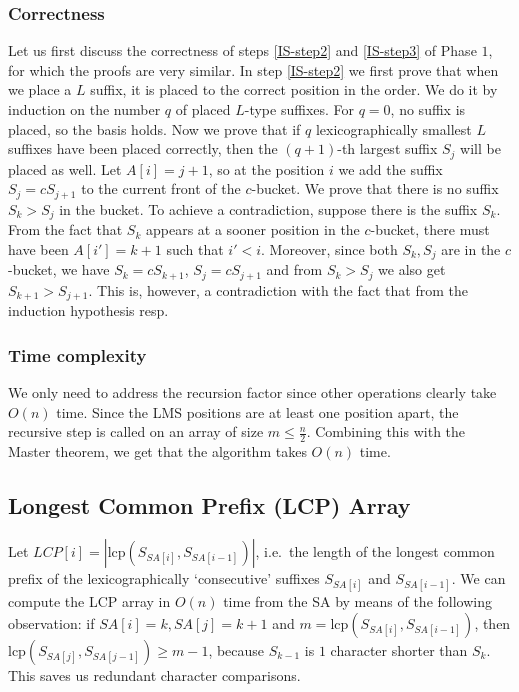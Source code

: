 \subsubsection{Correctness}
Let us first discuss the correctness of steps \ref{IS-step2} and \ref{IS-step3} of Phase $1$, for which the proofs are very similar.
In step \ref{IS-step2} we first prove that when we place a $L$ suffix, it is placed to the correct position in the order.
We do it by induction on the number $q$ of placed $L$-type suffixes.
For $q = 0$, no suffix is placed, so the basis holds.
Now we prove that if $q$ lexicographically smallest $L$ suffixes have been placed correctly, then the $(q+1)$-th largest suffix $S_j$ will be placed as well.
Let $A[i] = j+1$, so at the position $i$ we add the suffix $S_j = c S_{j+1}$ to the current front of the $c$-bucket.
We prove that there is no suffix $S_k > S_j$ in the bucket.
To achieve a contradiction, suppose there is the suffix $S_k$.
From the fact that $S_k$ appears at a sooner position in the $c$-bucket, there must have been $A[i'] = k+1$ such that $i' < i$.
Moreover, since both $S_k, S_j$ are in the $c$-bucket, we have $S_k = c S_{k+1}$, $S_j = c S_{j+1}$ and from $S_k > S_j$ we also get $S_{k+1} > S_{j+1}$.
This is, however, a contradiction with the fact that from the induction hypothesis resp.


\subsubsection{Time complexity}
We only need to address the recursion factor since other operations clearly take $O(n)$ time.
Since the LMS positions are at least one position apart, the recursive step is called on an array of size $m \leq \frac{n}{2}$.
Combining this with the Master theorem, we get that the algorithm takes $O(n)$ time.

\hypertarget{longest-common-prefix-lcp-array}{%
\subsection{Longest Common Prefix (LCP) Array}\label{longest-common-prefix-lcp-array}}

Let $LCP[i] = |\textrm{lcp}(S_{SA[i]}, S_{SA[i-1]})|$, i.e.~the length of the longest common prefix of the lexicographically `consecutive' suffixes $S_{SA[i]}$ and $S_{SA[i-1]}$.
We can compute the LCP array in $O(n)$ time from the SA by means of the following observation: if $SA[i] = k, SA[j] = k+1$ and $m = \textrm{lcp}(S_{SA[i]}, S_{SA[i-1]})$, then $\textrm{lcp}(S_{SA[j]}, S_{SA[j-1]})\geq m-1$, because $S_{k-1}$ is $1$ character shorter than $S_k$. This saves us redundant character comparisons.


